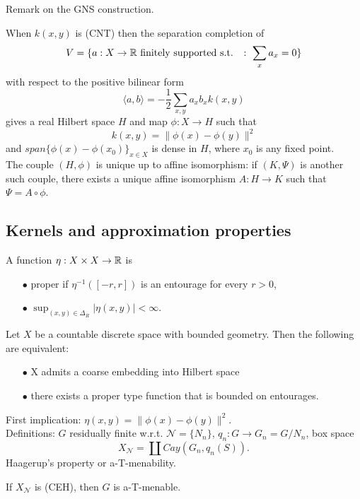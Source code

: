 Remark on the GNS construction.

When $k(x,y)$ is (CNT) then the separation completion of 
\[V = \{a : X\rightarrow \mathbb R \text{ finitely supported s.t. }\ : \ \sum_x a_x = 0\}\]
with respect to the positive bilinear form 
\[\langle a, b \rangle = -\frac{1}{2}\sum_{x,y} a_x b_x k(x,y) \]
gives a real Hilbert space $H$ and map $\phi: X \rightarrow H$ such that 
\[k(x,y) = \| \phi(x)-\phi(y) \|^2 \]
and $span\{\phi(x) - \phi(x_0)\}_{x\in X} $ is dense in $H$, where $x_0$ is any fixed point.\\ 

The couple $(H, \phi)$ is unique up to affine isomorphism: if $(K, \Psi)$ is another such couple, there exists a unique affine isomorphism $A: H \rightarrow K$ such that $\Psi =A\circ \phi $. 
 
\subsection{Kernels and approximation properties}

A function $\eta: X\times X \rightarrow \mathbb R$ is
\begin{itemize}
\item[$\bullet$] proper if $\eta^{-1}([-r,r])$ is an entourage for every $r>0$,
\item[$\bullet$] $\sup_{(x,y)\in \Delta_R} | \eta(x,y) | < \infty$.
\end{itemize}

\begin{thm}
Let $X$ be a countable discrete space with bounded geometry. Then the following are equivalent:
\begin{itemize}
\item[$\bullet$] X admits a coarse embedding into Hilbert space
\item[$\bullet$] there exists a proper  type function that is bounded on entourages.
\end{itemize}
\end{thm}

First implication: $\eta(x,y) = \| \phi(x) - \phi(y)\|^2$.\\

Definitions: $G$ residually finite w.r.t. $\mathcal N = \{N_n\}$, $q_n: G \rightarrow G_n = G/N_n$, box space
\[X_{\mathcal N} = \coprod Cay(G_n, q_n(S)).\]
Haagerup's property or a-T-menability.

\begin{prop}
If $X_{\mathcal N}$ is (CEH), then $G$ is a-T-menable.
\end{prop}

